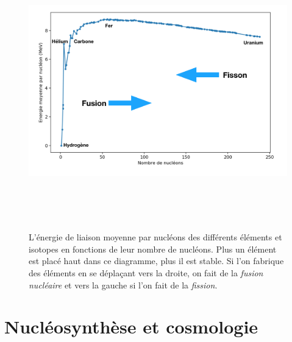 \begin{figure}[htbp]
	\centering
		\includegraphics[height=12cm]{figs/binding.png}
	\caption[Énergies de liaisons des différents éléments]{L'énergie de liaison moyenne par nucléons des différents éléments et isotopes en fonctions de leur nombre de nucléons. Plus un élément est placé haut dans ce diagramme, plus il est stable. Si l'on fabrique des éléments en se déplaçant vers la droite, on fait de la \textit{fusion nucléaire} et vers la gauche si l'on fait de la \textit{fission}.}
	\label{f:binding}
\end{figure}

\section{Nucléosynthèse et cosmologie}

